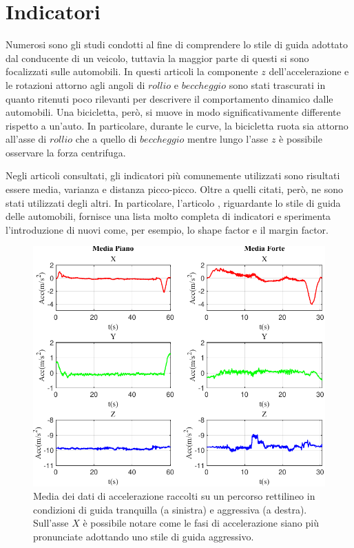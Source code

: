 \documentclass[class=article]{standalone}
\begin{document}
\section{Indicatori}
	Numerosi sono gli studi condotti al fine di comprendere lo stile di guida adottato dal conducente di un veicolo, tuttavia la maggior parte di questi si sono focalizzati sulle automobili.
	In questi articoli la componente \(z\) dell'accelerazione e le rotazioni attorno agli angoli di \(rollio\) e \(beccheggio\) sono stati trascurati in quanto ritenuti poco rilevanti per descrivere il comportamento dinamico dalle automobili.
	Una bicicletta, però, si muove in modo significativamente differente rispetto a un'auto.
	In particolare, durante le curve, la bicicletta ruota sia attorno all'asse di \(rollio\) che a quello di \(beccheggio\) mentre lungo l'asse \(z\) è possibile osservare la forza centrifuga.
	
	
	Negli articoli consultati, gli indicatori più comunemente utilizzati sono risultati essere media, varianza e distanza picco-picco. Oltre a quelli citati, però, ne sono stati utilizzati degli altri. In particolare, l'articolo \cite{chen}, riguardante lo stile di guida delle automobili, fornisce una lista molto completa di indicatori e sperimenta l'introduzione di nuovi come, per esempio, lo shape factor e il margin factor.\hfill\break
	
	\begin{center}
		\begin{figure}[h!]
			\centering\includegraphics[width=.7\textwidth]{img/lungaFP/Acc/Media}
			\caption[]{Media dei dati di accelerazione raccolti su un percorso rettilineo in condizioni di guida tranquilla (a sinistra) e aggressiva (a destra). Sull'asse \(X\) è possibile notare come le fasi di accelerazione siano più pronunciate adottando uno stile di guida aggressivo.}
			\label{fig:AccMedia_lungaFP}
		\end{figure}
	\end{center}
	
\end{document}
